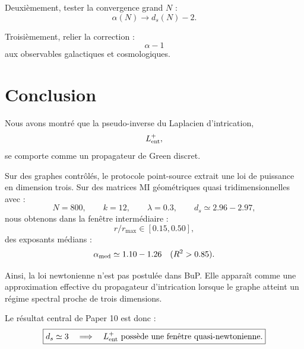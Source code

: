 \documentclass[11pt,a4paper]{article}
\begin{document}
Deuxièmement, tester la convergence grand \(N\) :
\[
\alpha(N)
\to
d_s(N)-2.
\]

Troisièmement, relier la correction :
\[
\alpha-1
\]
aux observables galactiques et cosmologiques.

\section{Conclusion}

Nous avons montré que la pseudo-inverse du Laplacien d'intrication,
\[
L_{\rm ent}^{+},
\]
se comporte comme un propagateur de Green discret.

Sur des graphes contrôlés, le protocole point-source extrait une loi de
puissance en dimension trois. Sur des matrices MI géométriques quasi
tridimensionnelles avec :
\[
N=800,
\qquad
k=12,
\qquad
\lambda=0.3,
\qquad
d_s\simeq2.96-2.97,
\]
nous obtenons dans la fenêtre intermédiaire :
\[
r/r_{\max}\in[0.15,0.50],
\]
des exposants médians :
\[
\alpha_{\rm med}\simeq1.10-1.26
\quad
(R^2>0.85).
\]

Ainsi, la loi newtonienne n'est pas postulée dans BuP. Elle apparaît comme une
approximation effective du propagateur d'intrication lorsque le graphe atteint
un régime spectral proche de trois dimensions.

Le résultat central de Paper 10 est donc :
\[
\boxed{
d_s\simeq3
\quad
\Longrightarrow
\quad
L_{\rm ent}^{+}
\text{ possède une fenêtre quasi-newtonienne.}
}
\]
\end{document}
